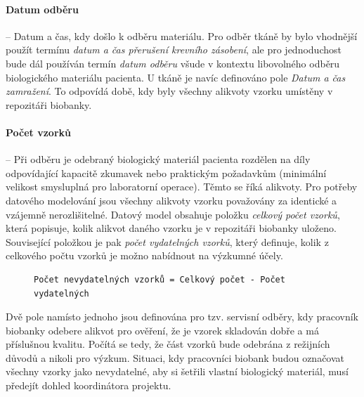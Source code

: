 \paragraph*{Datum odběru} --
Datum a čas, kdy došlo k odběru materiálu. Pro odběr tkáně by bylo vhodnější použít termínu \textit{datum a čas přerušení krevního zásobení}, ale pro jednoduchost bude dál používán termín \textit{datum odběru} všude v kontextu libovolného odběru biologického materiálu pacienta.
U tkáně je navíc definováno pole \textit{Datum a čas zamražení}. To odpovídá době, kdy byly všechny alikvoty vzorku umístěny v repozitáři biobanky.

\paragraph*{Počet vzorků} -- Při odběru je odebraný biologický materiál pacienta rozdělen na díly odpovídající kapacitě zkumavek nebo praktickým požadavkům (minimální velikost smysluplná pro laboratorní operace). Těmto  se říká alikvoty. Pro potřeby datového modelování jsou všechny alikvoty vzorku považovány za identické a vzájemně nerozlišitelné. 
Datový model obsahuje položku \textit{celkový počet vzorků}, která popisuje, kolik alikvot daného vzorku je v repozitáři biobanky uloženo. Související položkou je pak \textit{počet vydatelných vzorků}, který definuje, kolik z celkového počtu vzorků je možno nabídnout na výzkumné účely.
\begin{figure}[h!] %
\centering
\begin{BVerbatim}
Počet nevydatelných vzorků = Celkový počet - Počet vydatelných
\end{BVerbatim}
\end{figure}
Dvě pole namísto jednoho jsou definována pro tzv. servisní odběry, kdy pracovník biobanky odebere alikvot pro ověření, že je vzorek skladován dobře a má příslušnou kvalitu. Počítá se tedy, že část vzorků bude odebrána z režijních důvodů a nikoli pro výzkum.
Situaci, kdy pracovníci biobank budou označovat všechny vzorky jako nevydatelné, aby si šetřili vlastní biologický materiál, musí předejít dohled koordinátora projektu. 

